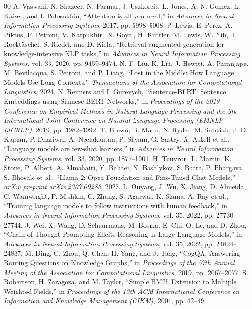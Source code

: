 \documentclass[journal,10pt]{IEEEtran}
\begin{document}
\begin{thebibliography}{00}
 A. Vaswani, N. Shazeer, N. Parmar, J. Uszkoreit, L. Jones, A. N. Gomez, \L. Kaiser, and I. Polosukhin, ``Attention is all you need,'' in \textit{Advances in Neural Information Processing Systems}, 2017, pp. 5998--6008.
 P. Lewis, E. Perez, A. Piktus, F. Petroni, V. Karpukhin, N. Goyal, H. Kuttler, M. Lewis, W. Yih, T. Rockt{\"{a}}schel, S. Riedel, and D. Kiela, ``Retrieval-augmented generation for knowledge-intensive NLP tasks,'' in \textit{Advances in Neural Information Processing Systems}, vol. 33, 2020, pp. 9459--9474.
 N. F. Liu, K. Lin, J. Hewitt, A. Paranjape, M. Bevilacqua, S. Petroni, and P. Liang, ``Lost in the Middle: How Language Models Use Long Contexts,'' \textit{Transactions of the Association for Computational Linguistics}, 2024.
 N. Reimers and I. Gurevych, ``Sentence-BERT: Sentence Embeddings using Siamese BERT-Networks,'' in \textit{Proceedings of the 2019 Conference on Empirical Methods in Natural Language Processing and the 9th International Joint Conference on Natural Language Processing (EMNLP-IJCNLP)}, 2019, pp. 3982--3992.
 T. Brown, B. Mann, N. Ryder, M. Subbiah, J. D. Kaplan, P. Dhariwal, A. Neelakantan, P. Shyam, G. Sastry, A. Askell et al., ``Language models are few-shot learners,'' in \textit{Advances in Neural Information Processing Systems}, vol. 33, 2020, pp. 1877--1901.
 H. Touvron, L. Martin, K. Stone, P. Albert, A. Almahairi, Y. Babaei, N. Bashlykov, S. Batra, P. Bhargava, S. Bhosale et al., ``Llama 2: Open Foundation and Fine-Tuned Chat Models,'' \textit{arXiv preprint arXiv:2307.09288}, 2023.
 L. Ouyang, J. Wu, X. Jiang, D. Almeida, C. Wainwright, P. Mishkin, C. Zhang, S. Agarwal, K. Slama, A. Ray et al., ``Training language models to follow instructions with human feedback,'' in \textit{Advances in Neural Information Processing Systems}, vol. 35, 2022, pp. 27730--27744.
 J. Wei, X. Wang, D. Schuurmans, M. Bosma, E. Chi, Q. Le, and D. Zhou, ``Chain-of-Thought Prompting Elicits Reasoning in Large Language Models,'' in \textit{Advances in Neural Information Processing Systems}, vol. 35, 2022, pp. 24824--24837.
 M. Ding, C. Zhou, Q. Chen, H. Yang, and J. Tang, ``CogQA: Answering Routing Questions on Knowledge Graphs,'' in \textit{Proceedings of the 57th Annual Meeting of the Association for Computational Linguistics}, 2019, pp. 2067--2077.
 S. Robertson, H. Zaragoza, and M. Taylor, ``Simple BM25 Extension to Multiple Weighted Fields,'' in \textit{Proceedings of the 13th ACM International Conference on Information and Knowledge Management (CIKM)}, 2004, pp. 42--49.

\end{thebibliography}
\end{document}
